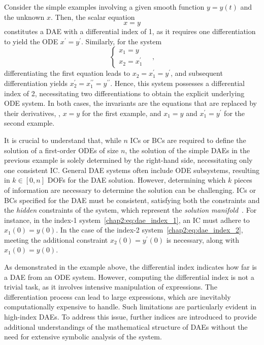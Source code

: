 \begin{example}
  Consider the simple examples involving a given smooth function $y = y(t)$ and the unknown $x$. Then, the scalar equation
  \begin{equation}
    x = y
    \label{chap2:eq:dae_index_1}
  \end{equation}
  constitutes a \ac{DAE} with a differential index of 1, as it requires one differentiation to yield the \ac{ODE} $x^{\prime} = y^{\prime}$. Similarly, for the system
  \begin{equation}
    \begin{cases}
      x_1 = y \\
      x_2 = x_1^{\prime}
    \end{cases} \quad \text{,}
    \label{chap2:eq:dae_index_2}
  \end{equation}
  differentiating the first equation leads to $x_2 = x_1^{\prime} = y^{\prime}$, and subsequent differentiation yields $x_2^{\prime} = x_1^{\prime\prime} = y^{\prime\prime}$. Hence, this system possesses a differential index of 2, necessitating two differentiations to obtain the explicit underlying \ac{ODE} system. In both cases, the invariants are the equations that are replaced by their derivatives, \ie{}, $x = y$ for the first example, and $x_1 = y$ and $x_1^{\prime} = y^{\prime}$ for the second example.
\end{example}

It is crucial to understand that, while $n$ \acp{IC} or \acp{BC} are required to define the solution of a first-order \acp{ODE} of size $n$, the solution of the simple \acp{DAE} in the previous example is solely determined by the right-hand side, necessitating only one consistent \ac{IC}. General \ac{DAE} systems often include \ac{ODE} subsystems, resulting in $k \in [0, n]$ \acp{DOF} for the \ac{DAE} solution. However, determining which $k$ pieces of information are necessary to determine the solution can be challenging. \acp{IC} or \acp{BC} specified for the \ac{DAE} must be consistent, satisfying both the constraints and the \emph{hidden} constraints of the system, which represent the \emph{solution manifold}~\cite{rheinboldt1984differential}. For instance, in the index-1 system~\eqref{chap2:eq:dae_index_1}, an \ac{IC} must adhere to $x_1(0) = y(0)$. In the case of the index-2 system~\eqref{chap2:eq:dae_index_2}, meeting the additional constraint $x_2(0) = y^{\prime}(0)$ is necessary, along with $x_1(0) = y(0)$.

As demonstrated in the example above, the differential index indicates how far is a \ac{DAE} from an \ac{ODE} system. However, computing the differential index is not a trivial task, as it involves intensive manipulation of expressions. The differentiation process can lead to large expressions, which are inevitably computationally expensive to handle. Such limitations are particularly evident in high-index \acp{DAE}. To address this issue, further indices are introduced to provide additional understandings of the mathematical structure of \acp{DAE} without the need for extensive symbolic analysis of the system.

